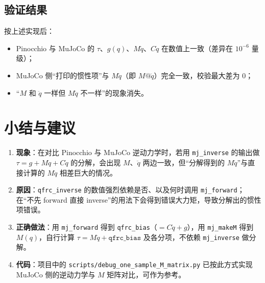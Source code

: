 \documentclass[12pt,a4paper]{article}
\begin{document}
\subsection{验证结果}

按上述实现后：
\begin{itemize}[leftmargin=*]
  \item Pinocchio 与 MuJoCo 的 $\tau$、$g(q)$、$M\ddot{q}$、$C\dot{q}$ 在数值上一致（差异在 $10^{-6}$ 量级）；
  \item MuJoCo 侧“打印的惯性项”与 $M\ddot{q}$（即 $M@\ddot{q}$）完全一致，校验最大差为 0；
  \item “$M$ 和 $\ddot{q}$ 一样但 $M\ddot{q}$ 不一样”的现象消失。
\end{itemize}

\section{小结与建议}

\begin{enumerate}[leftmargin=*]
  \item \textbf{现象}：在对比 Pinocchio 与 MuJoCo 逆动力学时，若用 \texttt{mj\_inverse} 的输出做 $\tau = g + M\ddot{q} + C\dot{q}$ 的分解，会出现 $M$、$\ddot{q}$ 两边一致，但“分解得到的 $M\ddot{q}$”与直接计算的 $M\ddot{q}$ 相差巨大的情况。
  \item \textbf{原因}：\texttt{qfrc\_inverse} 的数值强烈依赖是否、以及何时调用 \texttt{mj\_forward}；在“不先 forward 直接 inverse”的用法下会得到错误大力矩，导致分解出的惯性项错误。
  \item \textbf{正确做法}：用 \texttt{mj\_forward} 得到 \texttt{qfrc\_bias}（$= C\dot{q} + g$），用 \texttt{mj\_makeM} 得到 $M(q)$，自行计算 $\tau = M\ddot{q} + \texttt{qfrc\_bias}$ 及各分项，不依赖 \texttt{mj\_inverse} 做分解。
  \item \textbf{代码}：项目中的 \texttt{scripts/debug\_one\_sample\_M\_matrix.py} 已按此方式实现 MuJoCo 侧的逆动力学与 $M$ 矩阵对比，可作为参考。
\end{enumerate}
\end{document}
